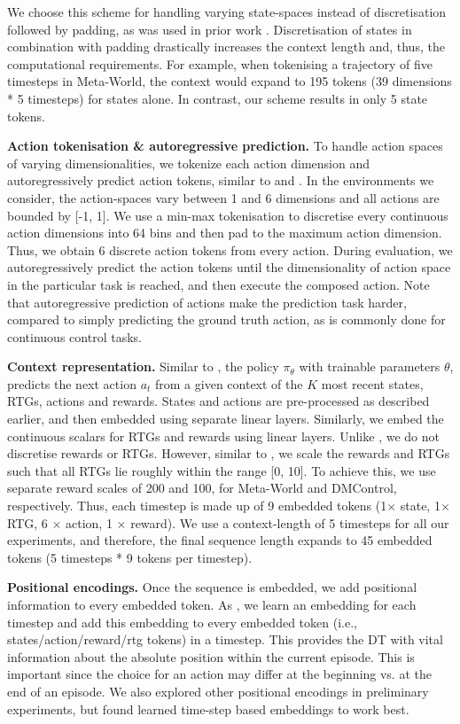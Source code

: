 We choose this scheme for handling varying state-spaces instead of discretisation followed by padding, as was used in prior work \citep{Reed:22}. Discretisation of states in combination with padding drastically increases the context length and, thus, the computational requirements. For example, when tokenising a trajectory of five timesteps in Meta-World, the context would expand to 195 tokens (39 dimensions * 5 timesteps) for states alone. In contrast, our scheme results in only 5 state tokens. 

\textbf{Action tokenisation \& autoregressive prediction.} 
To handle action spaces of varying dimensionalities, we tokenize each action dimension and autoregressively predict action tokens, similar to \citet{Reed:22} and \citet{Brohan:22}. 
In the environments we consider, the action-spaces vary between 1 and 6 dimensions and all actions are bounded by [-1, 1]. We use a min-max tokenisation to discretise every continuous action dimensions into 64 bins and then pad to the maximum action dimension. Thus, we obtain 6 discrete action tokens from every action. During evaluation, we autoregressively predict the action tokens until the dimensionality of action space in the particular task is reached, and then execute the composed action. Note that autoregressive prediction of actions make the prediction task harder, compared to simply predicting the ground truth action, as is commonly done for continuous control tasks.

\textbf{Context representation.} 
Similar to \citet{Lee:22}, the policy $\pi_{\theta}$ with trainable parameters $\theta$, predicts the next action $a_t$ from a given context of the $K$ most recent states, RTGs, actions and rewards.
States and actions are pre-processed as described earlier, and then embedded using separate linear layers. Similarly, we embed the continuous scalars for RTGs and rewards using linear layers. Unlike \citet{Lee:22}, we do not discretise rewards or RTGs. However, similar to \citet{Chen:21}, we scale the rewards and RTGs such that all RTGs lie roughly within the range [0, 10]. To achieve this, we use separate reward scales of 200 and 100, for Meta-World and DMControl, respectively. Thus, each timestep is made up of 9 embedded tokens (1$\times$ state, 1$\times$ RTG, 6 $\times$ action, 1 $\times$ reward). We use a context-length of 5 timesteps for all our experiments, and therefore, the final sequence length expands to 45 embedded tokens (5 timesteps * 9 tokens per timestep). 

\textbf{Positional encodings.} Once the sequence is embedded, we add positional information to every embedded token. 
As \citet{Chen:21}, we learn an embedding for each timestep and add this embedding to every embedded token (i.e., states/action/reward/rtg tokens) in a timestep.
This provides the DT with vital information about the absolute position within the current episode.
This is important since the choice for an action may differ at the beginning vs. at the end of an episode. 
We also explored other positional encodings in preliminary experiments, but found learned time-step based embeddings to work best. 

